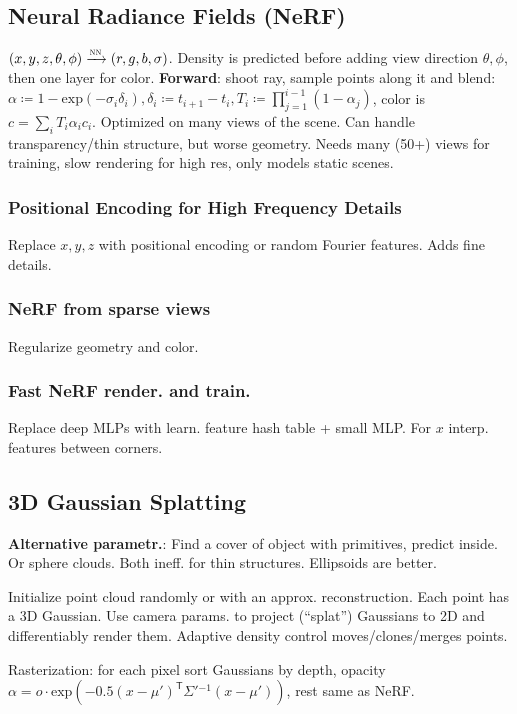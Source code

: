 \documentclass[11pt,landscape,a4paper,fleqn]{article}
\newcommand*{\tran}{^{\mathsf{T}}} %
\renewcommand{\exp}{\mathrm{exp}}
\begin{document}
\begin{multicols*}{4}
\subsection{Neural Radiance Fields (NeRF)} \phantom{a}

$(x, y, z, \theta, \phi) \xrightarrow{\textsc{nn}} (r, g, b, \sigma)$.
Density is predicted before adding view direction $\theta, \phi$,
then one layer for color.
\textbf{Forward}: shoot ray, sample points along it and blend:
$\alpha \coloneqq 1 - \exp( - \sigma_i \delta_i), \delta_i \coloneqq t_{i+1} - t_i,
T_i \coloneqq \prod_{j = 1}^{i-1}(1 - \alpha_j)$,
color is $c = \sum_i T_i \alpha_i c_i$.
Optimized on many views of the scene.
Can handle transparency/thin structure,
but worse geometry.
Needs many (50+) views for training, slow rendering for high res,
only models static scenes.

\subsubsection{Positional Encoding for High Frequency Details}
Replace $x, y, z$ with positional encoding or random Fourier features.
Adds fine details.

\subsubsection{NeRF from sparse views} Regularize geometry and color.

\subsubsection{Fast NeRF render. and train.}
Replace deep MLPs with learn. feature hash table + small MLP.
For $x$ interp. features between corners.

\subsection{3D Gaussian Splatting}

\textbf{Alternative parametr.}:
Find a cover of object with primitives, predict inside.
Or sphere clouds. Both ineff. for thin structures.
Ellipsoids are better.

Initialize point cloud randomly or with an approx. reconstruction.
Each point has a 3D Gaussian.
Use camera params. to project (``splat'') Gaussians to 2D
and differentiably render them.
Adaptive density control moves/clones/merges points.

Rasterization: for each pixel sort Gaussians by depth, opacity
$\alpha = o \cdot \exp( - 0.5(x - \mu')\tran \Sigma'{}^{-1}(x - \mu'))$,
rest same as NeRF.


\end{multicols*}
\end{document}
